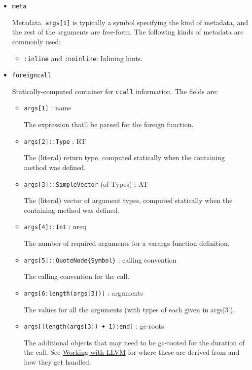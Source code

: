 \begin{itemize}
\item \texttt{meta}

Metadata. \texttt{args[1]} is typically a symbol specifying the kind of metadata, and the rest of the arguments are free-form. The following kinds of metadata are commonly used:

\begin{itemize}
\item \texttt{:inline} and \texttt{:noinline}: Inlining hints.

\end{itemize}

\item \texttt{foreigncall}

Statically-computed container for \texttt{ccall} information. The fields are:

\begin{itemize}
\item \texttt{args[1]} : name

The expression that{\textquotesingle}ll be parsed for the foreign function.


\item \texttt{args[2]::Type} : RT

The (literal) return type, computed statically when the containing method was defined.


\item \texttt{args[3]::SimpleVector} (of Types) : AT

The (literal) vector of argument types, computed statically when the containing method was defined.


\item \texttt{args[4]::Int} : nreq

The number of required arguments for a varargs function definition.


\item \texttt{args[5]::QuoteNode\{Symbol\}} : calling convention

The calling convention for the call.


\item \texttt{args[6:length(args[3])]} : arguments

The values for all the arguments (with types of each given in args[3]).


\item \texttt{args[(length(args[3]) + 1):end]} : gc-roots

The additional objects that may need to be gc-rooted for the duration of the call. See \hyperlink{16487312531471662451}{Working with LLVM} for where these are derived from and how they get handled.

\end{itemize}
\end{itemize}


